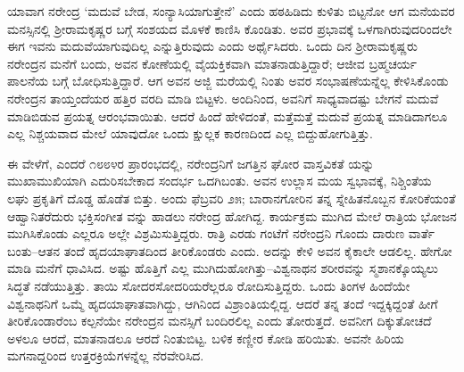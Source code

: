ಯಾವಾಗ ನರೇಂದ್ರ ‘ಮದುವೆ ಬೇಡ, ಸಂನ್ಯಾಸಿಯಾಗುತ್ತೇನೆ’ ಎಂದು ಹಠಹಿಡಿದು ಕುಳಿತು ಬಿಟ್ಟನೋ ಆಗ ಮನೆಯವರ ಮನಸ್ಸಿನಲ್ಲಿ ಶ್ರೀರಾಮಕೃಷ್ಣರ ಬಗ್ಗೆ ಸಂಶಯದ ಮೊಳಕೆ ಕಾಣಿಸಿ ಕೊಂಡಿತು. ಅವರ ಪ್ರಭಾವಕ್ಕೆ ಒಳಗಾಗಿರುವುದರಿಂದಲೇ ಈಗ ಇವನು ಮದುವೆಯಾಗುವುದಿಲ್ಲ ಎನ್ನುತ್ತಿರುವುದು ಎಂದು ಅರ್ಥೈಸಿದರು. ಒಂದು ದಿನ ಶ್ರೀರಾಮಕೃಷ್ಣರು ನರೇಂದ್ರನ ಮನೆಗೆ ಬಂದು, ಅವನ ಕೋಣೆಯಲ್ಲಿ ವೈಯಕ್ತಿಕವಾಗಿ ಮಾತನಾಡುತ್ತಿದ್ದಾರೆ; ಆಜೀವ ಬ್ರಹ್ಮಚರ್ಯ ಪಾಲನೆಯ ಬಗ್ಗೆ ಬೋಧಿಸುತ್ತಿದ್ದಾರೆ. ಆಗ ಅವನ ಅಜ್ಜಿ ಮರೆಯಲ್ಲಿ ನಿಂತು ಅವರ ಸಂಭಾಷಣೆಯನ್ನೆಲ್ಲ ಕೇಳಿಸಿಕೊಂಡು ನರೇಂದ್ರನ ತಾಯ್ತಂದೆಯರ ಹತ್ತಿರ ವರದಿ ಮಾಡಿ ಬಿಟ್ಟಳು. ಅಂದಿನಿಂದ, ಅವನಿಗೆ ಸಾಧ್ಯವಾದಷ್ಟು ಬೇಗನೆ ಮದುವೆ ಮಾಡಿಬಿಡುವ ಪ್ರಯತ್ನ ಆರಂಭವಾಯಿತು. ಆದರೆ ಹಿಂದೆ ಹೇಳಿದಂತೆ, ಮತ್ತೆಮತ್ತೆ ಮದುವೆ ಪ್ರಯತ್ನ ಮಾಡಿದಾಗಲೂ ಎಲ್ಲ ನಿಶ್ಚಯವಾದ ಮೇಲೆ ಯಾವುದೋ ಒಂದು ಕ್ಷುಲ್ಲಕ ಕಾರಣದಿಂದ ಎಲ್ಲ ಬಿದ್ದುಹೋಗುತ್ತಿತ್ತು.

ಈ ವೇಳೆಗೆ, ಎಂದರೆ ೧೮೮೪ರ ಪ್ರಾರಂಭದಲ್ಲಿ, ನರೇಂದ್ರನಿಗೆ ಜಗತ್ತಿನ ಘೋರ ವಾಸ್ತವಿಕತೆ ಯನ್ನು ಮುಖಾಮುಖಿಯಾಗಿ ಎದುರಿಸಬೇಕಾದ ಸಂದರ್ಭ ಒದಗಿಬಂತು. ಅವನ ಉಲ್ಲಾಸ ಮಯ ಸ್ವಭಾವಕ್ಕೆ, ನಿಶ್ಚಿಂತೆಯ ಲಘು ಪ್ರಕೃತಿಗೆ ದೊಡ್ಡ ಹೊಡೆತ ಬಿತ್ತು. ಅಂದು ಫೆಬ್ರವರಿ ೨೫; ಬಾರಾನಗೋರಿನ ತನ್ನ ಸ್ನೇಹಿತನೊಬ್ಬನ ಕೋರಿಕೆಯಂತೆ ಆಹ್ವಾನಿತರೆದುರು ಭಕ್ತಿಸಂಗೀತ ವನ್ನು ಹಾಡಲು ನರೇಂದ್ರ ಹೋಗಿದ್ದ. ಕಾರ್ಯಕ್ರಮ ಮುಗಿದ ಮೇಲೆ ರಾತ್ರಿಯ ಭೋಜನ ಮುಗಿಸಿಕೊಂಡು ಎಲ್ಲರೂ ಅಲ್ಲೇ ವಿಶ್ರಮಿಸುತ್ತಿದ್ದರು. ರಾತ್ರಿ ಎರಡು ಗಂಟೆಗೆ ನರೇಂದ್ರನಿ ಗೊಂದು ದಾರುಣ ವಾರ್ತೆ ಬಂತು–ಆತನ ತಂದೆ ಹೃದಯಾಘಾತದಿಂದ ತೀರಿಕೊಂಡರು ಎಂದು. ಅದನ್ನು ಕೇಳಿ ಅವನ ಕೈಕಾಲೇ ಆಡಲಿಲ್ಲ. ಹೇಗೋ ಮಾಡಿ ಮನೆಗೆ ಧಾವಿಸಿದ. ಅಷ್ಟು ಹೊತ್ತಿಗೆ ಎಲ್ಲ ಮುಗಿದುಹೋಗಿತ್ತು–ವಿಶ್ವನಾಥನ ಶರೀರವನ್ನು ಸ್ಮಶಾನಕ್ಕೊಯ್ಯಲು ಸಿದ್ಧತೆ ನಡೆಯುತ್ತಿತ್ತು. ತಾಯಿ ಸೋದರಸೋದರಿಯರೆಲ್ಲರೂ ರೋದಿಸುತ್ತಿದ್ದರು. ಒಂದು ತಿಂಗಳ ಹಿಂದೆಯೇ ವಿಶ್ವನಾಥನಿಗೆ ಒಮ್ಮೆ ಹೃದಯಾಘಾತವಾಗಿದ್ದು, ಆಗಿನಿಂದ ವಿಶ್ರಾಂತಿಯಲ್ಲಿದ್ದ. ಆದರೆ ತನ್ನ ತಂದೆ ಇದ್ದಕ್ಕಿದ್ದಂತೆ ಹೀಗೆ ತೀರಿಕೊಂಡಾರೆಂಬ ಕಲ್ಪನೆಯೇ ನರೇಂದ್ರನ ಮನಸ್ಸಿಗೆ ಬಂದಿರಲಿಲ್ಲ ಎಂದು ತೋರುತ್ತದೆ. ಅವನೀಗ ದಿಕ್ಕುತೋಚದೆ ಅಳಲೂ ಆರದೆ, ಮಾತನಾಡಲೂ ಆರದೆ ನಿಂತುಬಿಟ್ಟ. ಬಳಿಕ ಕಣ್ಣೀರ ಕೋಡಿ ಹರಿಯಿತು. ಅವನೇ ಹಿರಿಯ ಮಗನಾದ್ದರಿಂದ ಉತ್ತರಕ್ರಿಯೆಗಳನ್ನೆಲ್ಲ ನೆರವೇರಿಸಿದ.


